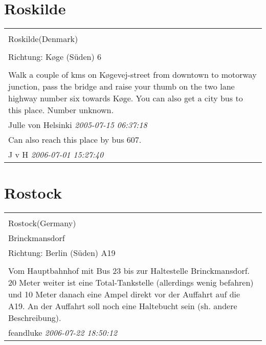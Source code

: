\documentclass[a4paper,12pt]{article}
\begin{document}
\section{Roskilde}
\begin{tabular}{|p{13cm}|}
\hline\\
Roskilde(Denmark)\\
\\
Richtung: Køge (Süden) 6 \\
\hline\\
Walk a couple of kms on Køgevej-street from downtown to motorway junction, pass the bridge and raise your thumb on the two lane highway number six towards Køge. You can also get a city bus to this place. Number unknown. \\
Julle von Helsinki \textit{ 2005-07-15 06:37:18 }\\\hline Can also reach this place by bus 607. \\
J v H \textit{ 2006-07-01 15:27:40 }\\\hline
\end{tabular}


\section{Rostock}
\begin{tabular}{|p{13cm}|}
\hline\\
Rostock(Germany)\\
Brinckmansdorf\\
Richtung: Berlin (Süden) A19 \\
\hline\\
Vom Hauptbahnhof mit Bus 23 bis zur Haltestelle Brinckmansdorf. 20 Meter weiter ist eine Total-Tankstelle (allerdings wenig befahren) und 10 Meter danach eine Ampel direkt vor der Auffahrt auf die A19. An der Auffahrt soll noch eine Haltebucht sein (sh. andere Beschreibung). \\
feandluke \textit{ 2006-07-22 18:50:12 }\\\hline
\end{tabular}
\end{document}
